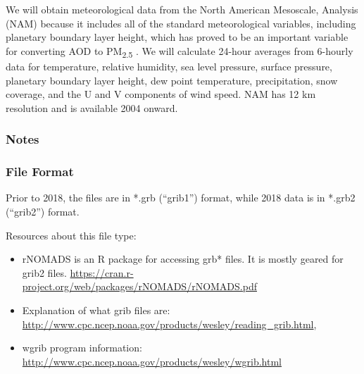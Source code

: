 We will obtain meteorological data from the North American Mesoscale, Analysis (NAM) because it includes all of the standard meteorological variables, including planetary boundary layer height, which has proved to be an important variable for converting AOD to PM\textsubscript{2.5} \citep{liu_estimating_2005}. We will calculate 24-hour averages from 6-hourly data for temperature, relative humidity, sea level pressure, surface pressure, planetary boundary layer height, dew point temperature, precipitation, snow coverage, and the U and V components of wind speed. NAM has 12 km resolution and is available 2004 onward.

\subsubsection*{Notes}


\subsubsection*{File Format}

Prior to 2018, the files are in *.grb (``grib1'') format, while 2018 data is in *.grb2 (``grib2'') format.

Resources about this file type: 
\begin{itemize}
\item rNOMADS is an R package for accessing grb* files. It is mostly geared for grib2 files. \url{https://cran.r-project.org/web/packages/rNOMADS/rNOMADS.pdf}
\item Explanation of what grib files are: \url{http://www.cpc.ncep.noaa.gov/products/wesley/reading_grib.html}, 
\item wgrib program information: \url{http://www.cpc.ncep.noaa.gov/products/wesley/wgrib.html}

\end{itemize}


